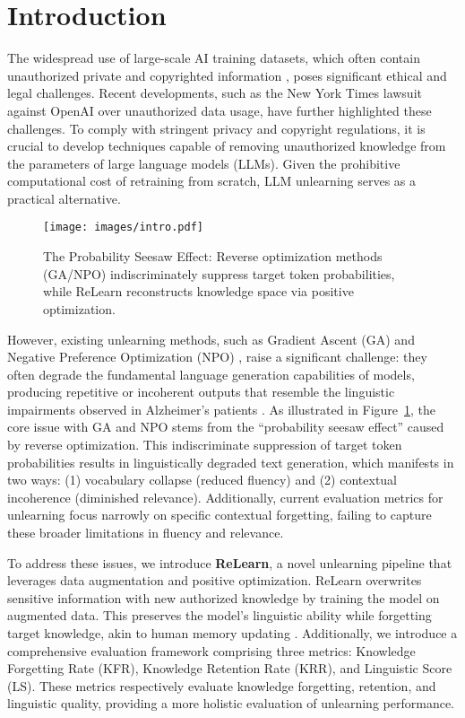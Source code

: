 \section{Introduction}
\label{section:intro}
The widespread use of large-scale AI training datasets, which often contain unauthorized private and copyrighted information \citep{carlini2021extractingtrainingdatalarge,Chen_2024,Lucchi_2024}, poses significant ethical and legal challenges.
Recent developments, such as the New York Times lawsuit against OpenAI \citep{npr2025nytopenai} over unauthorized data usage, have further highlighted these challenges.
To comply with stringent privacy and copyright regulations, it is crucial to develop techniques capable of removing unauthorized knowledge from the parameters of large language models (LLMs). 
Given the prohibitive computational cost of retraining from scratch, LLM unlearning serves as a practical alternative.

\begin{figure}[!t]
\texttt{[image: images/intro.pdf]}
\vspace{-3ex}
\caption{The Probability Seesaw Effect: Reverse optimization methods (GA/NPO) indiscriminately suppress target token probabilities, while ReLearn reconstructs knowledge space via positive optimization.}
\vspace{-3ex}
\label{fig:intro}
\end{figure}

However, existing unlearning methods, such as Gradient Ascent (GA) \citep{ga} and Negative Preference Optimization (NPO) \citep{npo}, raise a significant challenge: they often degrade the fundamental language generation capabilities of models, producing repetitive or incoherent outputs that resemble the linguistic impairments observed in Alzheimer's patients \citep{fraser2016linguistic}. 
As illustrated in Figure~\ref{fig:intro}, the core issue with GA and NPO stems from the ``probability seesaw effect'' caused by reverse optimization. 
This indiscriminate suppression of target token probabilities results in linguistically degraded text generation, which manifests in two ways:
(1) vocabulary collapse (reduced fluency)
and (2) contextual incoherence (diminished relevance). 
Additionally, current evaluation metrics for unlearning focus narrowly on specific contextual forgetting, failing to capture these broader limitations in fluency and relevance. 

To address these issues, we introduce \textbf{ReLearn}, a novel unlearning pipeline that leverages data augmentation and positive optimization.
ReLearn overwrites sensitive information with new authorized knowledge by training the model on augmented data.
This preserves the model's linguistic ability while forgetting target knowledge, akin to human memory updating \citep{Lee2017}. 
Additionally, we introduce a comprehensive evaluation framework comprising three metrics: Knowledge Forgetting Rate (KFR), Knowledge Retention Rate (KRR), and Linguistic Score (LS).
These metrics respectively evaluate knowledge forgetting, retention, and linguistic quality, providing a more holistic evaluation of unlearning performance. 

